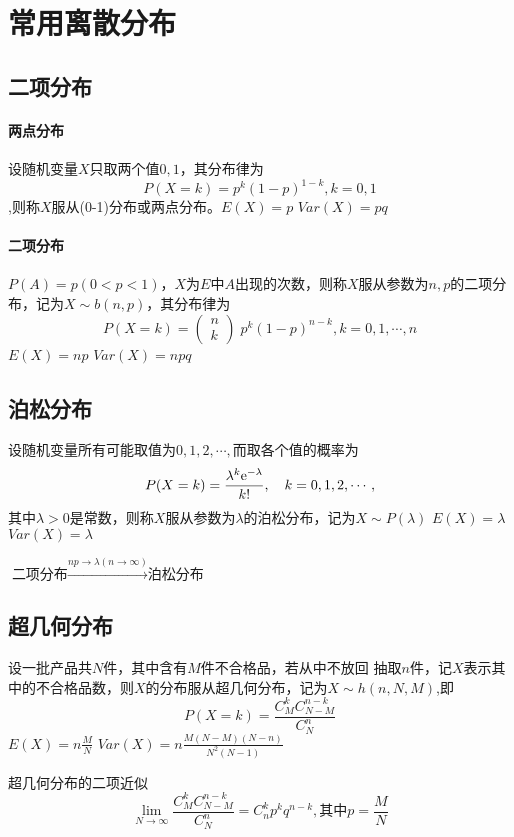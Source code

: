 \section{常用离散分布}
\subsection{二项分布}

\paragraph{两点分布}
设随机变量$X$只取两个值$0,1$，其分布律为$$P(X=k)=p^k(1-p)^{1-k},k=0,1$$,则称$X$服从(0-1)分布或两点分布。$E(X) =p$
$Var(X) =pq$

\paragraph{二项分布}
$P(A)=p(0< p <1)$，$X$为$E$中$A$出现的次数，则称$X$服从参数为$n,p$的二项分布，记为$X \sim b(n,p)$，其分布律为$$P(X=k)=\left( \begin{array}{l}n\\k\end{array} \right)\;{p^k}{(1 - p)^{n - k}},k=0,1,\cdots,n$$
$E(X)=np$
$Var(X)=npq$

\subsection{泊松分布}
设随机变量所有可能取值为$0,1,2,\cdots,$而取各个值的概率为$$P(X = k) = \frac{{{\lambda ^k}{{\rm{e}}^{ - \lambda }}}}{{k!}},\quad k = 0,1,2, \cdots ,$$
其中$\lambda >0$是常数，则称$X$服从参数为$\lambda$的泊松分布，记为$X \sim P(\lambda)$
$E(X)=\lambda$
$Var(X)=\lambda$

$\text{二项分布}\xrightarrow{np \rightarrow \lambda (n \to \infty)}\text{泊松分布}$

\subsection{超几何分布}
设一批产品共$N$件，其中含有$M$件不合格品，若从中不放回
抽取$n$件，记$X$表示其中的不合格品数，则$X$的分布服从超几何分布，记为$X \sim h(n,N,M)$,即
$$P(X = k) = \frac{{C_M^kC_{N - M}^{n - k}}}{{C_N^n}}$$
$E(X)=n\frac{M}{N}$
$Var(X) = n\frac{{M(N - M)(N - n)}}{{{N^2}(N - 1)}}$

超几何分布的二项近似
$$\mathop {\lim }\limits_{N \to \infty } \frac{{C_M^kC_{N - M}^{n - k}}}{{C_N^n}} = C_n^k{p^k}{q^{n - k}},\text{其中}p = \frac{M}{N}$$

